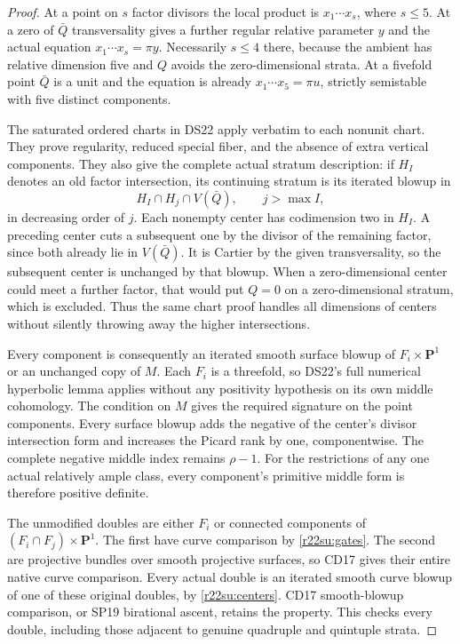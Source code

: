 \begin{proof}
At a point on $s$ factor divisors the local product is
$x_1\cdots x_s$, where $s\le5$.  At a zero of $\bar Q$
transversality gives a further regular relative parameter $y$
and the actual equation $x_1\cdots x_s=\pi y$.
Necessarily $s\le4$ there, because the ambient has relative
dimension five and $Q$ avoids the zero-dimensional strata.
At a fivefold point $\bar Q$ is a unit and the equation is
already $x_1\cdots x_5=\pi u$, strictly semistable with
five distinct components.

The saturated ordered charts in DS22 apply verbatim to each
nonunit chart.  They prove regularity, reduced special fiber,
and the absence of extra vertical components.  They also give
the complete actual stratum description: if $H_I$ denotes an
old factor intersection, its continuing stratum is its iterated
blowup in
\[
                   H_I\cap H_j\cap V(\bar Q),\qquad j>\max I,
 \tag{SU22.6}\label{r22su:centers}
\]
in decreasing order of $j$.  Each nonempty center has
codimension two in $H_I$.  A preceding center cuts a subsequent
one by the divisor of the remaining factor, since both already
lie in $V(\bar Q)$.  It is Cartier by the given transversality,
so the subsequent center is unchanged by that blowup.  When a
zero-dimensional center could meet a further factor, that would
put $Q=0$ on a zero-dimensional stratum, which is excluded.
Thus the same chart proof handles all dimensions of centers
without silently throwing away the higher intersections.

Every component is consequently an iterated smooth surface
blowup of $F_i\times\mathbf P^1$ or an unchanged copy of $M$.
Each $F_i$ is a threefold, so DS22's full numerical hyperbolic
lemma applies without any positivity hypothesis on its own
middle cohomology.  The condition on $M$ gives the required
signature on the point components.  Every surface blowup adds
the negative of the center's divisor intersection form and
increases the Picard rank by one, componentwise.  The complete
negative middle index remains $\rho-1$.  For the restrictions
of any one actual relatively ample class, every component's
primitive middle form is therefore positive definite.

The unmodified doubles are either $F_i$ or connected components
of $(F_i\cap F_j)\times\mathbf P^1$.  The first have curve
comparison by \eqref{r22su:gates}.  The second are projective
bundles over smooth projective surfaces, so CD17 gives their
entire native curve comparison.  Every actual double is an
iterated smooth curve blowup of one of these original doubles,
by \eqref{r22su:centers}.  CD17 smooth-blowup comparison, or
SP19 birational ascent, retains the property.  This checks every
double, including those adjacent to genuine quadruple and
quintuple strata.


\end{proof}
